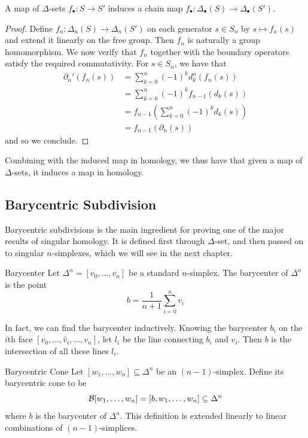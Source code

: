 \documentclass[a4paper]{article}
\begin{document}
\begin{lmm}{}{} A map of $\Delta$-sets $f_\bullet:S\to S'$ induces a chain map $f_\bullet:\Delta_\bullet(S)\to\Delta_\bullet(S')$. \tcbline
\begin{proof}
Define $f_n:\Delta_n(S)\to\Delta_n(S')$ on each generator $s\in S_n$ by $s\mapsto f_n(s)$ and extend it linearly on the free group. Then $f_n$ is naturally a group homomorphism. We now verify that $f_n$ together with the boundary operators satisfy the required commutativity. For $s\in S_n$, we have that 
\begin{align*}
\partial_n'(f_n(s))&=\sum_{k=0}^n(-1)^kd_k^n(f_n(s))\\
&=\sum_{k=0}^n(-1)^kf_{n-1}(d_k(s))\\
&=f_{n-1}\left(\sum_{k=0}^n(-1)^kd_k(s)\right)\\
&=f_{n-1}(\partial_n(s))
\end{align*}
and so we conclude. 
\end{proof}
\end{lmm}

Combining with the induced map in homology, we thus have that given a map of $\Delta$-sets, it induces a map in homology. 

\subsection{Barycentric Subdivision}
Barycentric subdivisions is the main ingredient for proving one of the major results of singular homology. It is defined first through $\Delta$-set, and then passed on to singular $n$-simplexes, which we will see in the next chapter. 

\begin{defn}{Barycenter}{} Let $\Delta^n=[v_0,\dots,v_n]$ be a standard $n$-simplex. The barycenter of $\Delta^n$ is the point $$b=\frac{1}{n+1}\sum_{i=0}^nv_i$$
\end{defn}

In fact, we can find the barycenter inductively. Knowing the barycenter $b_i$ on the $i$th face $[v_0,\dots,\hat{v}_i,\dots,v_n]$, let $l_i$ be the line connecting $b_i$ and $v_i$. Then $b$ is the intersection of all these lines $l_i$. 

\begin{defn}{Barycentric Cone}{} Let $[w_1,\dots,w_n]\subseteq\Delta^n$ be an $(n-1)$-simplex. Define its barycentric cone to be $$\mathcal{B}[w_1,\dots,w_n]=[b,w_1,\dots,w_n]\subseteq\Delta^n$$ where $b$ is the barycenter of $\Delta^n$. This definition is extended linearly to linear combinations of $(n-1)$-simplices. 
\end{defn}
\end{document}

